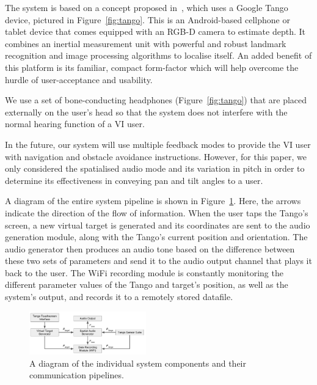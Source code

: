 \documentclass[format=sigconf, review=true, screen=true, anonymous=true]{acmart}
\begin{document}
The system is based on a concept proposed in~\cite{bellotto2013, lock2017portable}, which uses a Google Tango device, pictured in Figure~\ref{fig:tango}. This is an Android-based cellphone or tablet device that comes equipped with an RGB-D camera to estimate depth. It combines an inertial measurement unit with powerful and robust landmark recognition and image processing algorithms to localise itself. An added benefit of this platform is its familiar, compact form-factor which will help overcome the hurdle of user-acceptance and usability. %

We use a set of bone-conducting headphones (Figure~\ref{fig:tango}) that are placed externally on the user's head so that the system does not interfere with the normal hearing function of a VI user. 

In the future, our system will use multiple feedback modes to provide the VI user with navigation and obstacle avoidance instructions. However, for this paper, we only considered the spatialised audio mode and its variation in pitch in order to determine its effectiveness in conveying pan and tilt angles to a user.

A diagram of the entire system pipeline is shown in Figure~\ref{fig:pipeline}. Here, the arrows indicate the direction of the flow of information. When the user taps the Tango's screen, a new virtual target is generated and its coordinates are sent to the audio generation module, along with the Tango's current position and orientation. The audio generator then produces an audio tone based on the difference between these two sets of parameters and send it to the audio output channel that plays it back to the user. The WiFi recording module is constantly monitoring the different parameter values of the Tango and target's position, as well as the system's output, and records it to a remotely stored datafile. 

\begin{figure}
  \centering
  \includegraphics[width=0.45\textwidth]{figures/pipeline.pdf}
  \caption{A diagram of the individual system components and their communication pipelines. }
  \label{fig:pipeline}
\end{figure}
\end{document}
